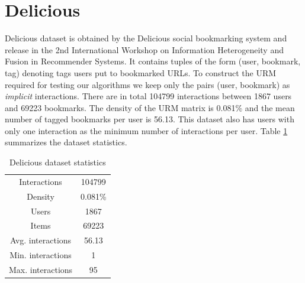 \section{Delicious}
Delicious\cite{Cantador:RecSys2011} dataset is obtained by the Delicious social bookmarking system and release in the 2nd International Workshop on Information Heterogeneity and Fusion in Recommender Systems. It contains tuples of the form (user, bookmark, tag) denoting tags users put to bookmarked URLs. To construct the URM required for testing our algorithms we keep only the pairs (user, bookmark) as \emph{implicit} interactions. There are in total 104799 interactions between 1867 users and 69223 bookmarks. The density of the URM matrix is 0.081\% and the mean number of tagged bookmarks per user is 56.13. This dataset also has users with only one interaction as the minimum number of interactions per user. Table \ref{tab:delicious_stats} summarizes the dataset statistics.

\begin{table}[h!]
    \centering
    \begin{tabular}{c|c}
        \hline
        Interactions & 104799 \\
        Density & 0.081\% \\
        Users & 1867 \\
        Items & 69223 \\
        Avg. interactions & 56.13 \\
        Min. interactions & 1 \\
        Max. interactions & 95 \\
        \hline
    \end{tabular}
    \caption{Delicious dataset statistics}
    \label{tab:delicious_stats}
\end{table}

